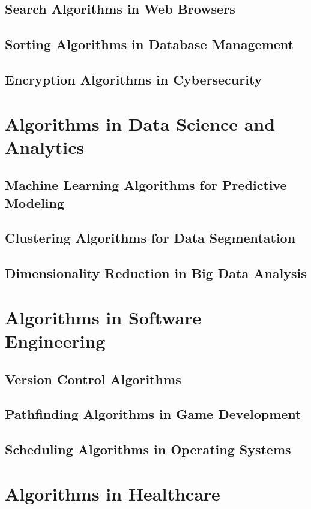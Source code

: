\documentclass[12pt]{book} %
\begin{document}
\subsection{Search Algorithms in Web Browsers}
\subsection{Sorting Algorithms in Database Management}
\subsection{Encryption Algorithms in Cybersecurity}

\section{Algorithms in Data Science and Analytics}
\subsection{Machine Learning Algorithms for Predictive Modeling}
\subsection{Clustering Algorithms for Data Segmentation}
\subsection{Dimensionality Reduction in Big Data Analysis}

\section{Algorithms in Software Engineering}
\subsection{Version Control Algorithms}
\subsection{Pathfinding Algorithms in Game Development}
\subsection{Scheduling Algorithms in Operating Systems}

\section{Algorithms in Healthcare}
\end{document}
